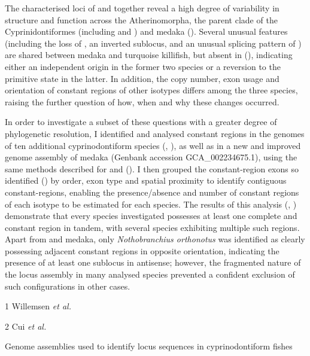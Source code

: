 The characterised \igh{} loci of \nfu and \xma together reveal a high degree of variability in structure and function across the Atherinomorpha, the parent clade of the Cyprinidontiformes (including \Nfu and \Xma) and medaka (). Several unusual features (including the loss of , an inverted sublocus, and an unusual splicing pattern of ) are shared between medaka and turquoise killifish, but absent in \Xma (), indicating either an independent origin in the former two species or a reversion to the primitive state in the latter. In addition, the copy number, exon usage and orientation of constant regions of other isotypes differs among the three species, raising the further question of how, when and why these changes occurred. 

In order to investigate a subset of these questions with a greater degree of phylogenetic resolution, I identified and analysed \igh{} constant regions in the genomes of ten additional cyprinodontiform species (, ), as well as in a new and improved genome assembly of medaka (Genbank accession GCA\_002234675.1), using the same methods described for \Nfu and \Xma (). I then grouped the constant-region exons so identified () by order, exon type and spatial proximity to identify contiguous constant-regions, enabling the presence/absence and number of constant regions of each isotype to be estimated for each species. The results of this analysis (, ) demonstrate that every species investigated possesses at least one complete  and  constant region in tandem, with several species exhibiting multiple such regions. Apart from \Nfu and medaka, only \textit{Nothobranchius orthonotus} was identified as clearly possessing adjacent constant regions in opposite orientation, indicating the presence of at least one sublocus in antisense; however, the fragmented nature of the \igh{} locus assembly in many analysed species prevented a confident exclusion of such configurations in other cases.

\begin{table}[bh!]
\centering
\begin{threeparttable}

\begin{tablenotes}
\item[1] Willemsen \textit{et al.} \parencite{willemsen2019popgen}
\item[2] Cui \textit{et al.} \parencite{cui2019annual}
\end{tablenotes}
\end{threeparttable}
\vspace{0.5em}
\caption{Genome assemblies used to identify \igh{} locus sequences in cyprinodontiform fishes}
\label{tab:cyprinodontiform-genomes}
\end{table}

